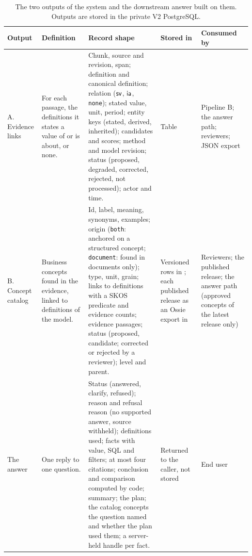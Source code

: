 \begin{table}[H]
\centering\scriptsize\setlength{\tabcolsep}{3pt}
\caption{The two outputs of the system and the downstream answer built on them. Outputs are stored in the private V2 PostgreSQL.}
\label{tab:outputs}
\begin{tabular}{L{1.7cm}L{3.4cm}L{4.6cm}L{2.4cm}L{2.3cm}}
\toprule
Output & Definition & Record shape & Stored in & Consumed by\\\midrule
A. Evidence links & For each passage, the definitions it states a value of or is about, or none. & Chunk, source and revision, span; definition and canonical definition; relation ($\mathsf{sv}$, $\mathsf{ia}$, \texttt{none}); stated value, unit, period; entity keys (stated, derived, inherited); candidates and scores; method and model revision; status (proposed, degraded, corrected, rejected, not processed); actor and time. & Table  & Pipeline B; the answer path; reviewers; JSON export\\
B. Concept catalog & Business concepts found in the evidence, linked to definitions of the model. & Id, label, meaning, synonyms, examples; origin (\texttt{both}: anchored on a structured concept; \texttt{document}: found in documents only); type, unit, grain; links to definitions with a SKOS predicate and evidence counts; evidence passages; status (proposed, candidate; corrected or rejected by a reviewer); level and parent. & Versioned rows in ; each published release as an Ossie export in  & Reviewers; the published release; the answer path (approved concepts of the latest release only)\\
The answer & One reply to one question. & Status (answered, clarify, refused); reason and refusal reason (no supported answer, source withheld); definitions used; facts with value, SQL and filters; at most four citations; conclusion and comparison computed by code; summary; the plan; the catalog concepts the question named and whether the plan used them; a server-held handle per fact. & Returned to the caller, not stored & End user\\
\bottomrule
\end{tabular}
\end{table}
